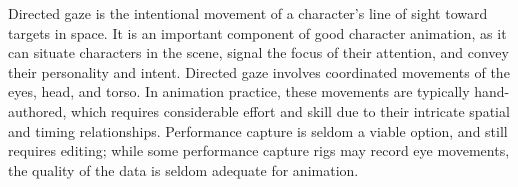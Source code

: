 Directed gaze is the intentional movement of a character's line of sight toward targets in space. It is an important component of good character animation, as it can situate characters in the scene, signal the focus of their attention, and convey their personality and intent. Directed gaze involves coordinated movements of the eyes, head, and torso. In animation practice, these movements are typically hand-authored, which requires considerable effort and skill due to their intricate spatial and timing relationships. Performance capture is seldom a viable option, and still requires editing; while some performance capture rigs may record eye movements, the quality of the data is seldom adequate for animation.

